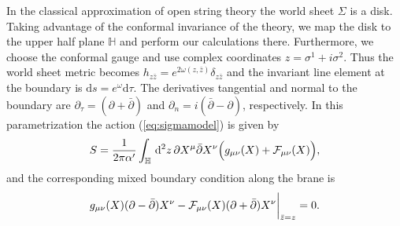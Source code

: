 \documentclass[a4paper,12pt]{article}
\newcommand {\ud} {\mathrm{d}}
\newcommand {\cF} {{\cal F}}
\newcommand {\bbH}{\mathbb{H}}
\begin{document}
In the classical approximation of open string theory the world sheet 
$\Sigma$ is a disk. Taking advantage of the conformal invariance 
of the theory, we map the disk to the upper half plane $\bbH$ and perform
our calculations there. Furthermore, we choose the conformal gauge
and use complex coordinates $z = \sigma^1 + i \sigma^2$. Thus the 
world sheet metric becomes 
$h_{z\bar z} = e^{2\omega(z,\bar z)} \delta_{z\bar z}$ and 
the invariant line element at the boundary is 
$\ud s = e^\omega \ud \tau$. The derivatives tangential and 
normal to the boundary are $\partial_\tau = (\partial + \bar \partial)$ and 
$\partial_n = i(\bar \partial - \partial)$, respectively. 
In this parametrization the action (\ref{eq:sigmamodel}) 
is given by 
\begin{eqnarray}
  \label{eq:actionconf}
  S = \frac 1{2\pi\alpha'} \int _\bbH \, \ud^2z \,
      {\partial X^\mu \bar\partial X^\nu 
       \Bigl(g_{\mu\nu}(X) + \cF_{\mu\nu}(X)\Bigr)},
\end{eqnarray}
and the corresponding mixed boundary condition along the brane is
\begin{eqnarray}
  \label{eq:boundary}
   g_{\mu\nu}(X)  (\partial-\bar\partial) X^\nu - 
   \cF_{\mu\nu}(X) (\partial+\bar\partial) X^\nu \biggr|_{\bar z = z}= 0.
\end{eqnarray}
\end{document}
